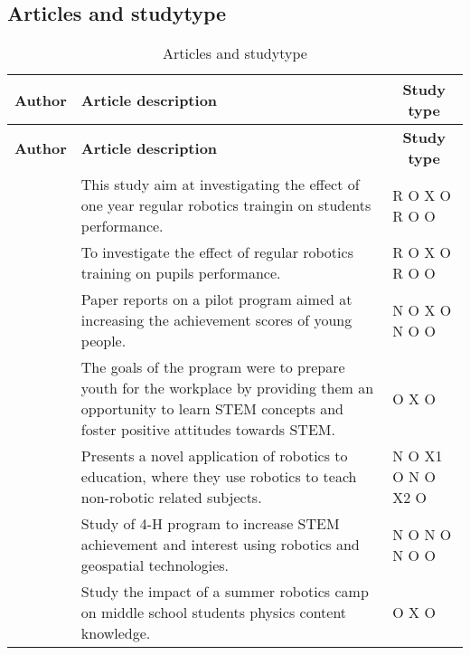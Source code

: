 \subsection*{Articles and studytype}
\setlength\LTleft{0px}
\setlength\LTright{0px}
\begin{longtable}{@{\extracolsep{\fill}}p{}p{}p{}}
	
	
	\hline \multicolumn{1}{l}{\textbf{Author}} & \multicolumn{1}{l}{\textbf{Article description}} & \multicolumn{1}{c}{\textbf{Study type	}} \\ \hline\hline
	\endfirsthead
	\hline\multicolumn{1}{l}{\textbf{Author}} & \multicolumn{1}{l}{\textbf{Article description}} & \multicolumn{1}{c}{\textbf{Study type	}} \\ \hline\hline
	\endhead
	\hline \caption{Articles and studytype}\endlastfoot
	\citet{hussain2006effect} & This study aim at investigating the effect of one year regular robotics traingin on students performance. & R O X O R O O\\\hline
	\citet{lindh2007does} & To investigate the effect of regular robotics training on pupils performance. & R O X O R O O\\\hline
	\citet{barker2007robotics}& Paper reports on a pilot program aimed at increasing the achievement scores of young people. & N O X O N O O\\\hline
	\citet{nugent2009use} & The goals of the program were to prepare youth for the workplace by providing them an opportunity to learn STEM concepts and foster positive attitudes towards STEM. & O X O\\\hline
	\citet{mitnik2008autonomous} & Presents a novel application of robotics to education, where they use robotics to teach non-robotic related subjects. & N O X1 O N O X2 O\\\hline
	\citet{nugent2008effect} & Study of 4-H program to increase STEM achievement and interest using robotics and geospatial technologies. & N O N O N O O\\\hline
	\citet{williams2007acquisition} & Study the impact of a summer robotics camp on middle school students physics content knowledge.  & O X O\\\hline
\end{longtable}
